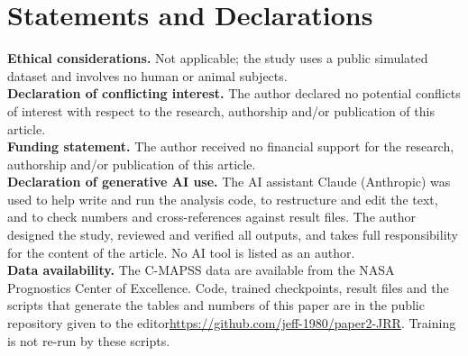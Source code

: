 \section*{Statements and Declarations}
\noindent\textbf{Ethical considerations.} Not applicable; the study uses a public simulated dataset and involves no human or animal subjects.\\[2pt]
\noindent\textbf{Declaration of conflicting interest.} The author declared no potential conflicts of interest with respect to the research, authorship and/or publication of this article.\\[2pt]
\noindent\textbf{Funding statement.} The author received no financial support for the research, authorship and/or publication of this article.\\[2pt]
\noindent\textbf{Declaration of generative AI use.} The AI assistant Claude (Anthropic) was used to help write and run the analysis code, to restructure and edit the text, and to check numbers and cross-references against result files. The author designed the study, reviewed and verified all outputs, and takes full responsibility for the content of the article. No AI tool is listed as an author.\\[2pt]
\noindent\textbf{Data availability.} The C-MAPSS data are available from the NASA Prognostics Center of Excellence. Code, trained checkpoints, result files and the scripts that generate the tables and numbers of this paper are in the public repository \ifanon given to the editor\else\url{https://github.com/jeff-1980/paper2-JRR}\fi. Training is not re-run by these scripts.

